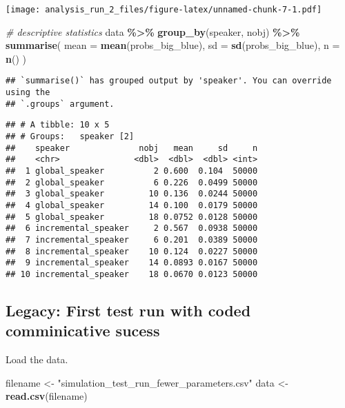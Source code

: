 \documentclass[
]{article}
\newenvironment{Shaded}{\begin{snugshade}}{\end{snugshade}}
\newcommand{\AttributeTok}[1]{\textcolor[rgb]{0.13,0.29,0.53}{#1}}
\newcommand{\CommentTok}[1]{\textcolor[rgb]{0.56,0.35,0.01}{\textit{#1}}}
\newcommand{\FunctionTok}[1]{\textcolor[rgb]{0.13,0.29,0.53}{\textbf{#1}}}
\newcommand{\NormalTok}[1]{#1}
\newcommand{\OtherTok}[1]{\textcolor[rgb]{0.56,0.35,0.01}{#1}}
\newcommand{\SpecialCharTok}[1]{\textcolor[rgb]{0.81,0.36,0.00}{\textbf{#1}}}
\newcommand{\StringTok}[1]{\textcolor[rgb]{0.31,0.60,0.02}{#1}}
\begin{document}
\texttt{[image: analysis\_run\_2\_files/figure-latex/unnamed-chunk-7-1.pdf]}

\begin{Shaded}
\begin{Highlighting}[]
\CommentTok{\# descriptive statistics}
\NormalTok{data }\SpecialCharTok{\%\textgreater{}\%} 
  \FunctionTok{group\_by}\NormalTok{(speaker, nobj) }\SpecialCharTok{\%\textgreater{}\%} 
  \FunctionTok{summarise}\NormalTok{(}
    \AttributeTok{mean =} \FunctionTok{mean}\NormalTok{(probs\_big\_blue),}
    \AttributeTok{sd =} \FunctionTok{sd}\NormalTok{(probs\_big\_blue),}
    \AttributeTok{n =} \FunctionTok{n}\NormalTok{()}
\NormalTok{  )}
\end{Highlighting}
\end{Shaded}

\begin{verbatim}
## `summarise()` has grouped output by 'speaker'. You can override using the
## `.groups` argument.
\end{verbatim}

\begin{verbatim}
## # A tibble: 10 x 5
## # Groups:   speaker [2]
##    speaker              nobj   mean     sd     n
##    <chr>               <dbl>  <dbl>  <dbl> <int>
##  1 global_speaker          2 0.600  0.104  50000
##  2 global_speaker          6 0.226  0.0499 50000
##  3 global_speaker         10 0.136  0.0244 50000
##  4 global_speaker         14 0.100  0.0179 50000
##  5 global_speaker         18 0.0752 0.0128 50000
##  6 incremental_speaker     2 0.567  0.0938 50000
##  7 incremental_speaker     6 0.201  0.0389 50000
##  8 incremental_speaker    10 0.124  0.0227 50000
##  9 incremental_speaker    14 0.0893 0.0167 50000
## 10 incremental_speaker    18 0.0670 0.0123 50000
\end{verbatim}

\hypertarget{legacy-first-test-run-with-coded-comminicative-sucess}{%
\subsection{Legacy: First test run with coded comminicative
sucess}\label{legacy-first-test-run-with-coded-comminicative-sucess}}

Load the data.

\begin{Shaded}
\begin{Highlighting}[]
\NormalTok{filename }\OtherTok{\textless{}{-}} \StringTok{"simulation\_test\_run\_fewer\_parameters.csv"}
\NormalTok{data }\OtherTok{\textless{}{-}} \FunctionTok{read.csv}\NormalTok{(filename)}
\end{Highlighting}
\end{Shaded}
\end{document}
